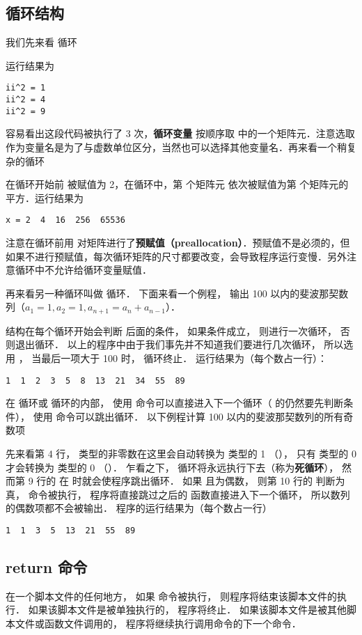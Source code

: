 \subsection{循环结构}
我们先来看  循环


运行结果为
\begin{lstlisting}[language=MatlabCom]
ii^2 = 1
ii^2 = 4
ii^2 = 9
\end{lstlisting}
容易看出这段代码被执行了 3 次，\textbf{循环变量}  按顺序取  中的一个矩阵元．注意选取  作为变量名是为了与虚数单位区分，当然也可以选择其他变量名．再来看一个稍复杂的循环


在循环开始前  被赋值为 2，在循环中，第  个矩阵元 依次被赋值为第  个矩阵元的平方．运行结果为
\begin{lstlisting}[language=MatlabCom]
x = 2  4  16  256  65536
\end{lstlisting}
注意在循环前用  对矩阵进行了\textbf{预赋值（preallocation）}．预赋值不是必须的，但如果不进行预赋值，每次循环矩阵的尺寸都要改变，会导致程序运行变慢．另外注意循环中不允许给循环变量赋值．

再来看另一种循环叫做  循环． 下面来看一个例程， 输出 100 以内的斐波那契数列（$a_1 = 1, a_2 = 1, a_{n+1} = a_{n} + a_{n-1}$）．


 结构在每个循环开始会判断  后面的条件， 如果条件成立， 则进行一次循环， 否则退出循环． 以上的程序中由于我们事先并不知道我们要进行几次循环， 所以选用 ， 当最后一项大于 100 时， 循环终止． 运行结果为（每个数占一行）：
\begin{lstlisting}[language=MatlabCom]
1  1  2  3  5  8  13  21  34  55  89
\end{lstlisting}

在  循环或  循环的内部， 使用  命令可以直接进入下一个循环（ 的仍然要先判断条件）， 使用  命令可以跳出循环． 以下例程计算 100 以内的斐波那契数列的所有奇数项


先来看第 4 行，  类型的非零数在这里会自动转换为  类型的 1 （）， 只有  类型的 0 才会转换为  类型的 0 （）． 乍看之下，  循环将永远执行下去（称为\textbf{死循环}）， 然而第 9 行的  在  时就会使程序跳出循环． 如果  且为偶数， 则第 10 行的  判断为真，  命令被执行， 程序将直接跳过之后的  函数直接进入下一个循环， 所以数列的偶数项都不会被输出． 程序的运行结果为（每个数占一行）
\begin{lstlisting}[language=MatlabCom]
1  1  3  5  13  21  55  89
\end{lstlisting}

\subsection{return 命令}
在一个脚本文件的任何地方， 如果  命令被执行， 则程序将结束该脚本文件的执行． 如果该脚本文件是被单独执行的， 程序将终止． 如果该脚本文件是被其他脚本文件或函数文件调用的， 程序将继续执行调用命令的下一个命令．



